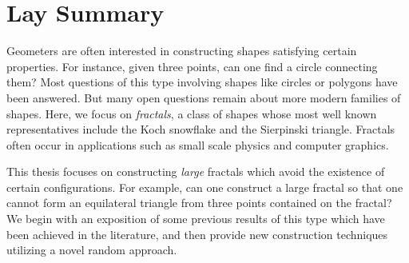 


\chapter{Lay Summary}



Geometers are often interested in constructing shapes satisfying certain properties. For instance, given three points, can one find a circle connecting them? Most questions of this type involving shapes like circles or polygons have been answered. But many open questions remain about more modern families of shapes. Here, we focus on \emph{fractals}, a class of shapes whose most well known representatives include the Koch snowflake and the Sierpinski triangle. Fractals often occur in applications such as small scale physics and computer graphics.

This thesis focuses on constructing \emph{large} fractals which avoid the existence of certain configurations. For example, can one construct a large fractal so that one cannot form an equilateral triangle from three points contained on the fractal? We begin with an exposition of some previous results of this type which have been achieved in the literature, and then provide new construction techniques utilizing a novel random approach.